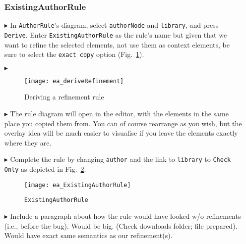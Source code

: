 \begin{itemize}

\subsubsection{ExistingAuthorRule} %

\item[$\blacktriangleright$] In \texttt{AuthorRule}'s diagram, select \texttt{authorNode} and \texttt{library}, and press \texttt{Derive}. Enter
\texttt{ExistingAuthorRule} as the rule's name but given that we want to refine the selected elements, not use them as context elements,
be sure to select the \texttt{exact copy} option (Fig.~\ref{ea:deriveRefinement}).

\item[$\blacktriangleright$]

\begin{figure}[htbp]
\begin{center}
  \texttt{[image: ea\_deriveRefinement]}
  \caption{Deriving a refinement rule}
  \label{ea:deriveRefinement}
\end{center}
\end{figure}

\item[$\blacktriangleright$] The rule diagram will open in the editor, with the elements in the same place you copied them from. You can of course rearrange as
you wish, but the overlay idea will  be much easier to visualise if you leave the elements exactly where they are.

\item[$\blacktriangleright$] Complete the rule by changing \texttt{author} and the link to \texttt{library} to \texttt{Check Only} as depicted in
Fig.~\ref{ea:existingAuthorRule}.

\begin{figure}[htbp]
\begin{center}
  \texttt{[image: ea\_ExistingAuthorRule]}
  \caption{\texttt{ExistingAuthorRule}}
  \label{ea:existingAuthorRule}
\end{center}
\end{figure}

\item[$\blacktriangleright$] \update Include a paragraph about how the rule would have looked w/o refinements (i.e., before the bug). Would be big. (Check
downloads folder; file prepared). Would have exact same semantics as our refinement(s).


\end{itemize}
